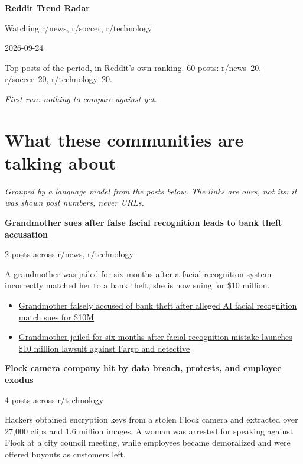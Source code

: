 \documentclass[11pt,a4paper]{article}
\begin{document}
{\LARGE\bfseries Reddit Trend Radar}\par
\vspace{4pt}
{\large Watching r/news, r/soccer, r/technology}\par
\vspace{2pt}
{\small 2026-09-24}\par
\vspace{16pt}
Top posts of the period, in Reddit's own ranking. 60 posts: r/news~20, r/soccer~20, r/technology~20.\par
\vspace{4pt}
{\small\itshape First run: nothing to compare against yet.}\par
\vspace{6pt}
\section*{What these communities are talking about}
{\small\itshape Grouped by a language model from the posts below. The links are ours, not its: it was shown post numbers, never URLs.}\par
\vspace{8pt}
\textbf{Grandmother sues after false facial recognition leads to bank theft accusation}\par
{\small 2 posts across r/news, r/technology}\par
\vspace{2pt}A grandmother was jailed for six months after a facial recognition system incorrectly matched her to a bank theft; she is now suing for \$10 million.\par
\begin{itemize}
  \item \href{https://www.reddit.com/r/news/comments/1wjet3h/grandmother_falsely_accused_of_bank_theft_after/}{Grandmother falsely accused of bank theft after alleged AI facial recognition match sues for \$10M}
  \item \href{https://www.reddit.com/r/technology/comments/1wiu59k/grandmother_jailed_for_six_months_after_facial/}{Grandmother jailed for six months after facial recognition mistake launches \$10 million lawsuit against Fargo and detective}
\end{itemize}
\vspace{6pt}
\textbf{Flock camera company hit by data breach, protests, and employee exodus}\par
{\small 4 posts across r/technology}\par
\vspace{2pt}Hackers obtained encryption keys from a stolen Flock camera and extracted over 27,000 clips and 1.6 million images. A woman was arrested for speaking against Flock at a city council meeting, while employees became demoralized and were offered buyouts as customers left.\par
\end{document}
